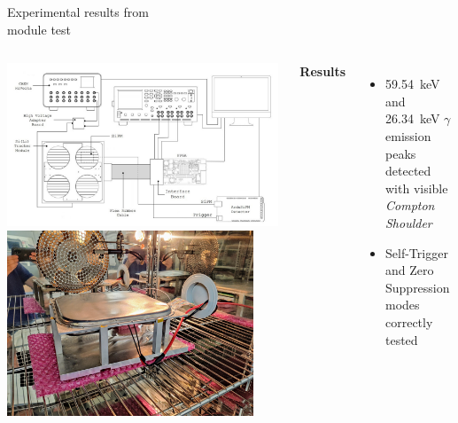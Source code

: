 \documentclass[aspectratio=169,xcolor=dvipsnames]{beamer}
\newcommand{\greencheck}{{\color{ForestGreen}\checkmark}}
\begin{document}
\begin{frame}{\vspace{-0.3cm}Experimental results from\\ \vskip-0.15cm module test}
\begin{columns}
            \begin{columns}
                    \includegraphics[width=0.99\textwidth]{images/muon_detection/test_setup_MODULE.jpg}
                    \includegraphics[width=0.9\textwidth]{images/muon_detection/foto_modulo_camera.jpg}
            \end{columns}

            \fontsize{10pt}{1}\selectfont
            \textbf{Results} \\
            \vspace{0.05cm}

            \fontsize{8.5pt}{1}\selectfont
            \begin{itemize}
                \item \SI{59.54}{\kilo\electronvolt} and \SI{26.34}{\kilo\electronvolt}  $\gamma$ emission peaks detected with visible \textit{Compton Shoulder} \greencheck
                \item Self-Trigger and Zero Suppression modes correctly tested \greencheck
            \end{itemize}


\end{columns}
\end{frame}
\end{document}
